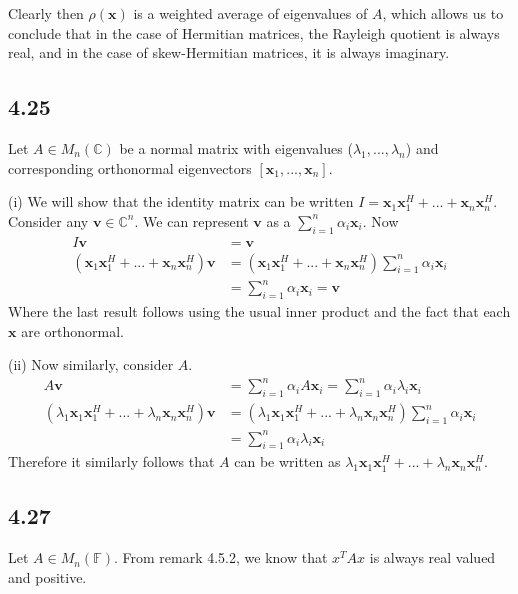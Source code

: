 \documentclass{article}
\begin{document}
	Clearly then $\rho(\mathbf{x})$ is a weighted average of eigenvalues of $A$, which allows us to conclude that in the case of Hermitian matrices, the Rayleigh quotient is always real, and in the case of skew-Hermitian matrices, it is always imaginary.
	
	\subsection*{4.25}
	Let $A \in M_n(\mathbb{C})$ be a normal matrix with eigenvalues ($\lambda_1,...,\lambda_n$) and corresponding orthonormal eigenvectors $[\mathbf{x}_1, ..., \mathbf{x}_n]$.
	
	(i) We will show that the identity matrix can be written $I = \mathbf{x}_1 \mathbf{x}_1^H + ... + \mathbf{x}_n \mathbf{x}_n^H$. Consider any $\mathbf{v} \in \mathbb{C}^n$. We can represent $\mathbf{v}$ as a $\sum_{i=1}^{n} \alpha_i \mathbf{x}_i$. Now
	\begin{align*}
	I \mathbf{v} &= \mathbf{v} \\
	(\mathbf{x}_1 \mathbf{x}_1^H + ... + \mathbf{x}_n \mathbf{x}_n^H) \mathbf{v} &=(\mathbf{x}_1 \mathbf{x}_1^H + ... + \mathbf{x}_n \mathbf{x}_n^H)  \sum_{i=1}^{n} \alpha_i \mathbf{x}_i \\
	&= \sum_{i=1}^{n} \alpha_i \mathbf{x}_i = \mathbf{v} 
	\end{align*}
	Where the last result follows using the usual inner product and the fact that each $\mathbf{x}$ are orthonormal. 
	
	(ii) Now similarly, consider $A$.
	\begin{align*}
	A \mathbf{v} &= \sum_{i=1}^{n} \alpha_i A \mathbf{x}_i = \sum_{i=1}^{n} \alpha_i \lambda_i \mathbf{x}_i \\
	(\lambda_1 \mathbf{x}_1 \mathbf{x}_1^H + ... + \lambda_n \mathbf{x}_n \mathbf{x}_n^H ) \mathbf{v} &= (\lambda_1 \mathbf{x}_1 \mathbf{x}_1^H + ... + \lambda_n \mathbf{x}_n \mathbf{x}_n^H ) \sum_{i=1}^{n} \alpha_i \mathbf{x}_i \\
	&= \sum_{i=1}^{n} \alpha_i \lambda_i \mathbf{x}_i
	\end{align*}
	Therefore it similarly follows that $A$ can be written as $\lambda_1 \mathbf{x}_1 \mathbf{x}_1^H + ... + \lambda_n \mathbf{x}_n \mathbf{x}_n^H$.
	
	\subsection*{4.27} 
	Let $A \in M_n(\mathbb{F})$. From remark 4.5.2, we know that $x^T A x$ is always real valued and positive.
	
\end{document}
